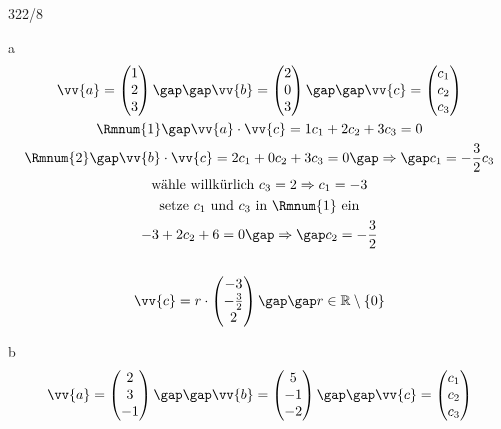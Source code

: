 \begin{exercise}{322/8}
  \item [a]
  \begin{gather*}
    \vv{a} = \begin{pmatrix}1 \\ 2 \\ 3\end{pmatrix} \gap\gap \vv{b} = \begin{pmatrix}2 \\ 0 \\ 3\end{pmatrix} \gap\gap \vv{c} = \begin{pmatrix}c_1 \\ c_2 \\ c_3\end{pmatrix} \\
    \text{\Rmnum{1}} \gap \vv{a} \cdot \vv{c} = 1c_1 + 2c_2 + 3c_3 = 0 \\
    \text{\Rmnum{2}} \gap \vv{b} \cdot \vv{c} = 2c_1 + 0c_2 + 3c_3 = 0 \gap\Rightarrow\gap c_1 = -\frac{3}{2}c_3 \\
    \text{wähle willkürlich } c_3 = 2 \Rightarrow c_1 = -3 \\
    \text{setze $c_1$ und $c_3$ in \Rmnum{1} ein} \\
    -3 + 2c_2 + 6 = 0 \gap\Rightarrow\gap c_2 = -\frac{3}{2} \\\\
    \vv{c} = r \cdot \begin{pmatrix}-3 \\ -\frac{3}{2} \\ 2\end{pmatrix} \gap\gap r \in \mathbb{R} \setminus \{0\}
  \end{gather*}
  \item [b]
  \begin{gather*}
    \vv{a} = \begin{pmatrix}2 \\ 3 \\ -1\end{pmatrix} \gap\gap \vv{b} = \begin{pmatrix}5 \\ -1 \\ -2\end{pmatrix} \gap\gap \vv{c} = \begin{pmatrix}c_1 \\ c_2 \\ c_3\end{pmatrix} \\

\end{gather*}
\end{exercise}
